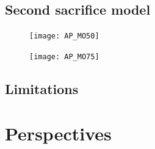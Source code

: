 \documentclass[a4paper,12pt]{report}
\begin{document}



















\section{Second sacrifice model}



\begin{figure}[h]
    \centering
    \texttt{[image: AP\_MO50]}
    \caption{}
    \label{fig:50}
    \end{figure}

    \begin{figure}[h]
        \centering
        \texttt{[image: AP\_MO75]}
        \caption{}
        \label{fig:75}
        \end{figure}
    




\section{Limitations}

\chapter{Perspectives}

%
%
\end{document}
